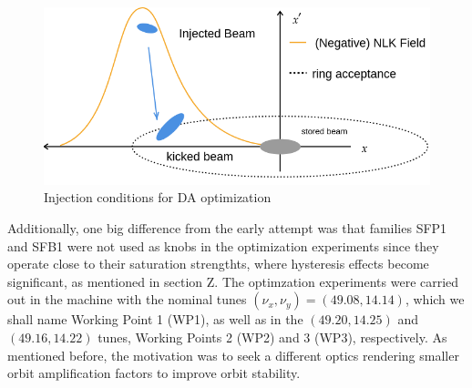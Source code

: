 \begin{figure}
    \centering
    \includegraphics[width=\columnwidth]{Images/inj_cond.png}
    \caption{Injection conditions for DA optimization}
    \label{fig:inj_cond}
\end{figure}

Additionally, one big difference from the early attempt was that families SFP1 and SFB1 were not used as knobs in the optimization experiments since they operate close to their saturation strengthts, where hysteresis effects become significant, as mentioned in section Z. The optimzation experiments were carried out in the machine with the nominal tunes $(\nu_x,\nu_y)=(49.08, 14.14)$, which we shall name Working Point 1 (WP1), as well as in the $(49.20, 14.25)$ and $(49.16, 14.22)$ tunes, Working Points 2 (WP2) and 3 (WP3), respectively. As mentioned before, the motivation was to seek a different optics rendering smaller orbit amplification factors to improve orbit stability.

